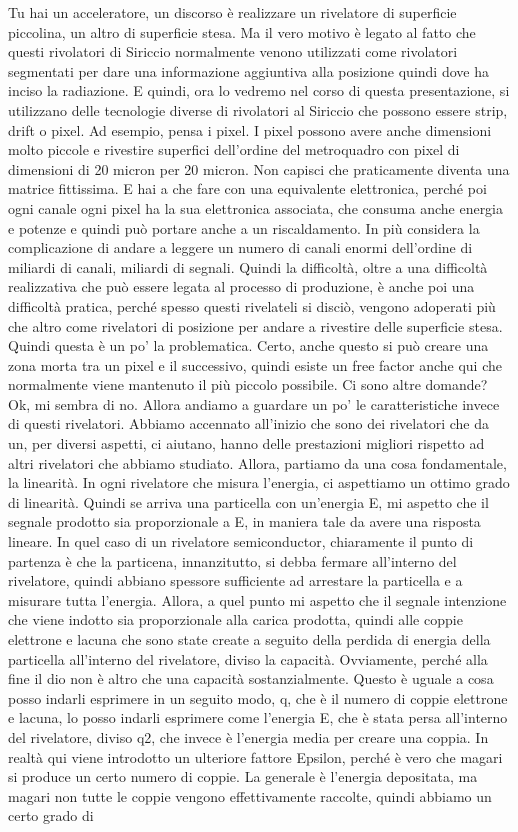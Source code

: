 Tu hai un acceleratore, un discorso è realizzare un rivelatore di superficie piccolina, un altro di superficie stesa. Ma il vero motivo è legato al fatto che questi rivolatori di Siriccio normalmente venono utilizzati come rivolatori segmentati per dare una informazione aggiuntiva alla posizione quindi dove ha inciso la radiazione. E quindi, ora lo vedremo nel corso di questa presentazione, si utilizzano delle tecnologie diverse di rivolatori al Siriccio che possono essere strip, drift o pixel. Ad esempio, pensa i pixel. I pixel possono avere anche dimensioni molto piccole e rivestire superfici dell'ordine del metroquadro con pixel di dimensioni di 20 micron per 20 micron. Non capisci che praticamente diventa una matrice fittissima. E hai a che fare con una equivalente elettronica, perché poi ogni canale ogni pixel ha la sua elettronica associata, che consuma anche energia e potenze e quindi può portare anche a un riscaldamento. In più considera la complicazione di andare a leggere un numero di canali enormi dell'ordine di miliardi di canali, miliardi di segnali. Quindi la difficoltà, oltre a una difficoltà realizzativa che può essere legata al processo di produzione, è anche poi una difficoltà pratica, perché spesso questi rivelateli si disciò, vengono adoperati più che altro come rivelatori di posizione per andare a rivestire delle superficie stesa. Quindi questa è un po' la problematica. Certo, anche questo si può creare una zona morta tra un pixel e il successivo, quindi esiste un free factor anche qui che normalmente viene mantenuto il più piccolo possibile. Ci sono altre domande? Ok, mi sembra di no. Allora andiamo a guardare un po' le caratteristiche invece di questi rivelatori. Abbiamo accennato all'inizio che sono dei rivelatori che da un, per diversi aspetti, ci aiutano, hanno delle prestazioni migliori rispetto ad altri rivelatori che abbiamo studiato. Allora, partiamo da una cosa fondamentale, la linearità. In ogni rivelatore che misura l'energia, ci aspettiamo un ottimo grado di linearità. Quindi se arriva una particella con un'energia E, mi aspetto che il segnale prodotto sia proporzionale a E, in maniera tale da avere una risposta lineare. In quel caso di un rivelatore semiconductor, chiaramente il punto di partenza è che la particena, innanzitutto, si debba fermare all'interno del rivelatore, quindi abbiano spessore sufficiente ad arrestare la particella e a misurare tutta l'energia. Allora, a quel punto mi aspetto che il segnale intenzione che viene indotto sia proporzionale alla carica prodotta, quindi alle coppie elettrone e lacuna che sono state create a seguito della perdida di energia della particella all'interno del rivelatore, diviso la capacità. Ovviamente, perché alla fine il dio non è altro che una capacità sostanzialmente. Questo è uguale a cosa posso indarli esprimere in un seguito modo, q, che è il numero di coppie elettrone e lacuna, lo posso indarli esprimere come l'energia E, che è stata persa all'interno del rivelatore, diviso q2, che invece è l'energia media per creare una coppia. In realtà qui viene introdotto un ulteriore fattore Epsilon, perché è vero che magari si produce un certo numero di coppie. La generale è l'energia depositata, ma magari non tutte le coppie vengono effettivamente raccolte, quindi abbiamo un certo grado di 
